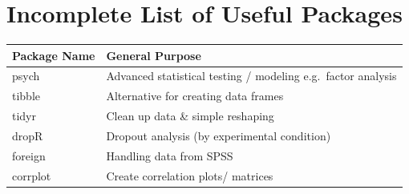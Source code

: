 \documentclass[
]{book}
\begin{document}
\section*{Incomplete List of Useful Packages}\label{lop}

\begin{longtable}[]{@{}ll@{}}
\toprule\noalign{}
Package Name & General Purpose \\
\midrule\noalign{}
\endhead
\bottomrule\noalign{}
\endlastfoot
psych & Advanced statistical testing / modeling e.g.~factor analysis \\
tibble & Alternative for creating data frames \\
tidyr & Clean up data \& simple reshaping \\
dropR & Dropout analysis (by experimental condition) \\
foreign & Handling data from SPSS \\
corrplot & Create correlation plots/ matrices \\
\end{longtable}

\nocite{R-base, R-bookdown, R-rmarkdown, R-dplyr, R-webexercises, R-ggplot2}

\end{document}
